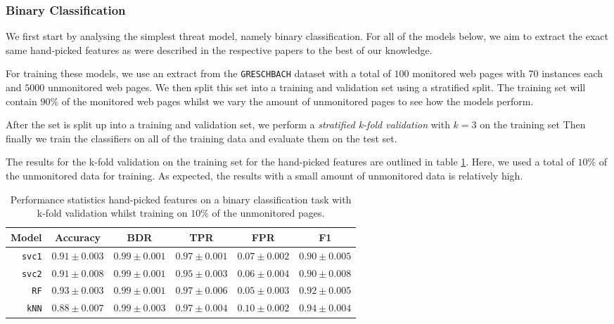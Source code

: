 \subsubsection{Binary Classification}

We first start by analysing the simplest threat model, namely binary classification.
For all of the models below, we aim to extract the exact same hand-picked features as were described in the respective papers to the best of our knowledge.

For training these models, we use an extract from the \texttt{GRESCHBACH} dataset with a total of $100$ monitored web pages with $70$ instances each and $5000$ unmonitored web pages.
We then split this set into a training and validation set using a stratified split.
The training set will contain $90\%$ of the monitored web pages whilst we vary the amount of unmonitored pages to see how the models perform.

After the set is split up into a training and validation set, we perform a \textit{stratified k-fold validation} with $k = 3$ on the training set
Then finally we train the classifiers on all of the training data and evaluate them on the test set.

The results for the k-fold validation on the training set for the hand-picked features are outlined in table \ref{table:hand-picked-bin}.
Here, we used a total of $10\%$ of the unmonitored data for training.
As expected, the results with a small amount of unmonitored data is relatively high.

\begin{table}[ht]
  \centering
  \begin{tabular}{ r  r  r  r  r  r } \hline
    \multicolumn{1}{c}{\textbf{Model}} & \multicolumn{1}{c}{\textbf{Accuracy}} & \multicolumn{1}{c}{\textbf{BDR}} & \multicolumn{1}{c}{\textbf{TPR}} &
      \multicolumn{1}{c}{\textbf{FPR}} & \multicolumn{1}{c}{\textbf{F1}} \\ \hline

    \texttt{svc1} & $0.91 \pm 0.003$ & $0.99 \pm 0.001$ & $0.97 \pm 0.001$ & $0.07 \pm 0.002$ & $0.90 \pm 0.005$ \\

    \texttt{svc2} & $0.91 \pm 0.008$ & $0.99 \pm 0.001$ & $0.95 \pm 0.003$ & $0.06 \pm 0.004$ & $0.90 \pm 0.008$ \\

    \texttt{RF} & $0.93 \pm 0.003$ & $0.99 \pm 0.001$ & $0.97 \pm 0.006$ & $0.05 \pm 0.003$ & $0.92 \pm 0.005$ \\

    \texttt{kNN} & $0.88 \pm 0.007$ & $0.99 \pm 0.003$ & $0.97 \pm 0.004$ & $0.10 \pm 0.002$ & $0.94 \pm 0.004$ \\

    \hline
  \end{tabular}
  \caption{Performance statistics hand-picked features on a binary classification task with k-fold validation whilst training on $10\%$ of the unmonitored pages.}
  \label{table:hand-picked-bin}
\end{table}

